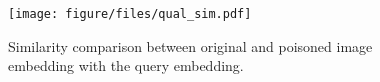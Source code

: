 
\begin{figure}[t]
\centering
    \texttt{[image: figure/files/qual\_sim.pdf]}
\vspace{-0.05in}    
\caption{Similarity comparison between original and poisoned image embedding with the query embedding.}
\label{fig:qual_sim}
\end{figure}

    

    
